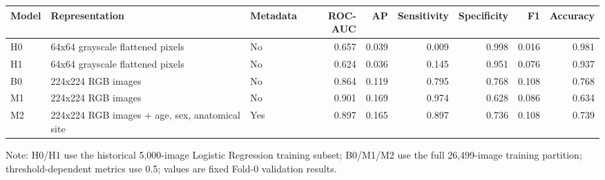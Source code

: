 \begin{table}[t]
\centering
\small
\begin{tabular}{lllrrrrrr}
\toprule
Model & Representation & Metadata & ROC-AUC & AP & Sensitivity & Specificity & F1 & Accuracy \\
\midrule
H0 & 64x64 grayscale flattened pixels & No & 0.657 & 0.039 & 0.009 & 0.998 & 0.016 & 0.981 \\
H1 & 64x64 grayscale flattened pixels & No & 0.624 & 0.036 & 0.145 & 0.951 & 0.076 & 0.937 \\
B0 & 224x224 RGB images & No & 0.864 & 0.119 & 0.795 & 0.768 & 0.108 & 0.768 \\
M1 & 224x224 RGB images & No & 0.901 & 0.169 & 0.974 & 0.628 & 0.086 & 0.634 \\
M2 & 224x224 RGB images + age, sex, anatomical site & Yes & 0.897 & 0.165 & 0.897 & 0.736 & 0.108 & 0.739 \\
\bottomrule
\end{tabular}
\vspace{2pt}
\parbox{0.98\textwidth}{\footnotesize Note: H0/H1 use the historical 5,000-image Logistic Regression training subset; B0/M1/M2 use the full 26,499-image training partition; threshold-dependent metrics use 0.5; values are fixed Fold-0 validation results.}
\end{table}
